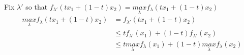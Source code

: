 Fix $\lambda'$ so that $f_{\lambda'}(tx_1 + (1-t)x_2) = \underset{\lambda}{max} f_\lambda(tx_1 + (1-t)x_2)$  
\begin{align*}
 \underset{\lambda}{max} f_\lambda(tx_1 + (1-t)x_2) &=f_{\lambda'}(tx_1 + (1-t)x_2)\\
 &\le tf_{\lambda'}(x_1)  + (1-t) f_{\lambda'}(x_2) \\
 &\le t \underset{\lambda}{max} f_{\lambda}(x_1)  + (1-t) \underset{\lambda}{max} f_{\lambda}(x_2) 
\end{align*}